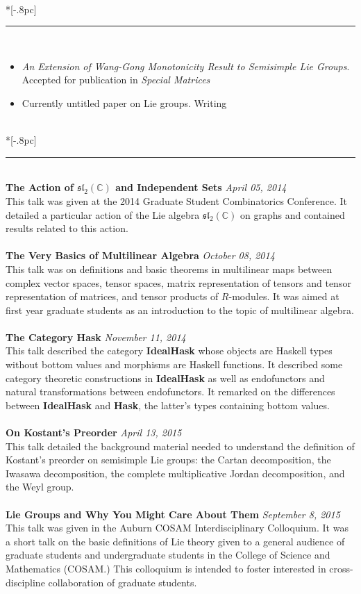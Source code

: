 \documentclass{article}
\begin{document}
 \\*[-.8pc]
\rule{\textwidth}{.1pt} \\
\begin{itemize}[noitemsep]
\item \emph{An Extension of Wang-Gong Monotonicity Result to Semisimple Lie
    Groups}. Accepted for publication in \textit{Special Matrices}
\item Currently untitled paper on Lie groups. Writing
\end{itemize}
 \\*[-.8pc]
\rule{\textwidth}{.1pt} \\
\textbf{The Action of \( \mathfrak{sl}_2(\mathbb{C}) \) and Independent Sets}
\hfill \textit{April 05, 2014}\\
This talk was given at the 2014 Graduate Student Combinatorics Conference. It
detailed a particular action of the Lie algebra
\( \mathfrak{sl}_2(\mathbb{C}) \)
on graphs and contained results related to this action.
\\ \\
\textbf{The Very Basics of Multilinear Algebra} \hfill \textit{October 08,
  2014}\\
This talk was on
definitions and basic theorems in multilinear maps between complex vector
spaces, tensor spaces, matrix representation of tensors and tensor
representation of matrices, and tensor products of $R$-modules. It was aimed at
first year graduate students as an introduction to the topic of multilinear
algebra.
\\ \\
\textbf{The Category \textup{Hask}} \hfill \textit{November 11, 2014}\\
This talk described the category \textbf{IdealHask} whose objects are Haskell
types without bottom values 
and morphisms are Haskell functions. It described some category theoretic
constructions in \textbf{IdealHask} as well as endofunctors and natural
transformations between endofunctors. It remarked on the differences between
\textbf{IdealHask} and \textbf{Hask}, the latter's types containing bottom
values.
\\ \\
\textbf{On Kostant's Preorder} \hfill \textit{April 13, 2015}\\
This talk detailed the background material needed to understand the definition
of Kostant's preorder on semisimple Lie groups: the Cartan decomposition, the
Iwasawa decomposition, the complete multiplicative Jordan decomposition, and the
Weyl group.
\\ \\
\textbf{Lie Groups and Why You Might Care About Them} \hfill \textit{September
  8, 2015} \\
This talk was given in the Auburn COSAM Interdisciplinary Colloquium. It was a
short talk on the basic definitions of Lie theory given to a general audience of
graduate students and undergraduate students in the College of Science and
Mathematics (COSAM.) This colloquium is intended to foster interested in
cross-discipline collaboration of graduate students.
\end{document}
